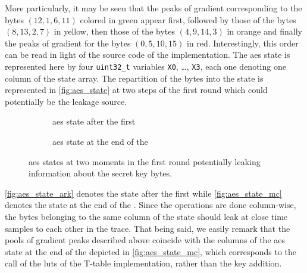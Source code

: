 More particularly, it may be seen that the peaks of gradient corresponding to the bytes \((12, 1, 6, 11)\) colored in green appear first, followed by those of the bytes \((8, 13, 2, 7)\) in yellow, then those of the bytes \((4, 9, 14, 3)\) in orange and finally the peaks of gradient for the bytes \((0, 5, 10, 15)\) in red.
Interestingly, this order can be read in light of the source code of the implementation.
The \gls{aes} state is represented here by four \verb+uint32_t+ variables \verb+X0+, 
\ldots, \verb+X3+, each one denoting one column of the state array.
The repartition of the bytes into the state is represented in \autoref{fig:aes_state} at two steps of the first round which could potentially be the leakage source.
\begin{figure}
	\begin{subfigure}{0.49 \textwidth}
		\centering
		
		\caption{\gls{aes} state after the first \ark{}}
		\label{fig:aes_state_ark}
	\end{subfigure}
	\begin{subfigure}{0.49 \textwidth}
		\centering
		
		\caption{\gls{aes} state at the end of the \sr{}}
		\label{fig:aes_state_mc}
	\end{subfigure}
	\caption{\gls{aes} states at two moments in the first round potentially leaking information about the secret key bytes.}
	\label{fig:aes_state}
\end{figure}
\autoref{fig:aes_state_ark} denotes the state after the first \ark{} while \autoref{fig:aes_state_mc} denotes the state at the end of the \sr{}.
Since the operations are done column-wise, the bytes belonging to the same column of the state should leak at close time samples to each other in the trace.
That being said, we easily remark that the pools of gradient peaks described above coincide with the columns of the \gls{aes} state at the end of the \sr{} depicted in \autoref{fig:aes_state_mc}, which corresponds to the call of the \glspl{lut} of the T-table implementation, rather than the key addition.

